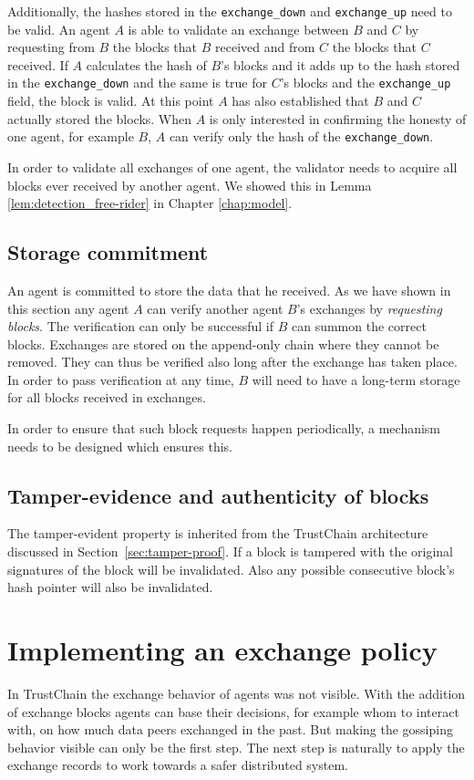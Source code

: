 Additionally, the hashes stored in the \verb|exchange_down| and \verb|exchange_up| need to be valid.
An agent $A$ is able to validate an exchange between $B$ and $C$ by requesting from $B$ the blocks 
that $B$ received and from $C$ the blocks that $C$ received. If $A$ calculates the hash of $B$'s blocks
and it adds up to the hash stored in the \verb|exchange_down| and the same is true for $C$'s blocks and
the \verb|exchange_up| field, the block is valid. At this point $A$ has also established that $B$ 
and $C$ actually stored the blocks. When $A$ is only interested in confirming the honesty of one 
agent, for example $B$, $A$ can verify only the hash of the \verb|exchange_down|.

In order to validate all exchanges of one agent, the validator needs to acquire all blocks ever 
received by another agent. We showed this in Lemma \ref{lem:detection_free-rider} in Chapter \ref{chap:model}.

\subsection{Storage commitment}
An agent is committed to store the data that he received. As we have shown in this section any agent
$A$ can verify another agent $B$'s exchanges by \textit{requesting blocks}. The verification can 
only be successful if $B$ can 
summon the correct blocks. Exchanges are stored on the append-only chain where they cannot be 
removed. They can thus be verified also long after the exchange has taken place. In order to pass
verification at any time, $B$ will need to have a long-term storage for all blocks received in 
exchanges.

In order to ensure that such block requests happen periodically, a mechanism needs to be designed 
which ensures this.

\subsection{Tamper-evidence and authenticity of blocks}
The tamper-evident property is inherited from the TrustChain architecture discussed in 
Section~\ref{sec:tamper-proof}. If a block is tampered with the original signatures of the block 
will be invalidated. Also any possible consecutive block's hash pointer will also be invalidated.

\section{Implementing an exchange policy}
In TrustChain the exchange behavior of agents was not visible. With the addition of exchange blocks
agents can base their decisions, for example whom to interact with, on how much data 
peers exchanged in the past. But making the gossiping behavior visible can only be the first step. 
The next step is naturally to apply the exchange records to work towards a safer distributed system.

